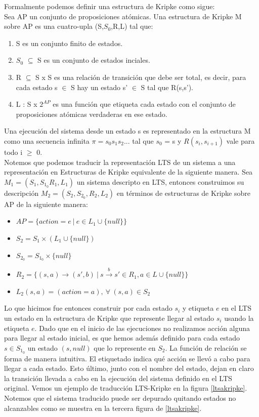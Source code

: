 \documentclass[titlepage, 12pt]{book}
\begin{document}
Formalmente podemos definir una estructura de Kripke como sigue\cite{Clarke}:\\

Sea AP un conjunto de proposiciones at\'omicas. Una estructura de Kripke M sobre AP es una cuatro-upla (S,$S_0$,R,L) tal que:
\begin{enumerate}
\item S es un conjunto finito de estados.
\item $S_0$ $\subseteq$ S es un conjunto de estados inciales.
\item R $\subseteq$ S x S es una relaci\'on de transici\'on que debe ser total, es decir, para cada estado s $\in$ S hay un estado s' $\in$ S tal que R(s,s').
\item L : S x $2^{AP}$ es una funci\'on que etiqueta cada estado con el conjunto de proposiciones atómicas verdaderas en ese estado.
\end{enumerate}
Una ejecuci\'on del sistema desde un estado s es representado en la estructura M como una secuencia infinita $\pi = s_0s_1s_2...$ tal que $s_0$ = s y $R(s_i,s_{i+1})$ vale para todo i $\geq$ 0.\\

Notemos que podemos traducir la representación LTS de un sistema a una representaci\'on en Estructuras de Kripke equivalente de la siguiente manera. Sea $M_1 = (S_1, S_{1_0} R_1, L_1)$ un sistema descripto en LTS, entonces construimos su descripci\'on $M_2 = (S_2,S_{2_0},R_2,L_2)$ en t\'erminos de estructuras de Kripke sobre AP de la siguiente manera:
\begin{itemize}
\item $ AP = \{action = e ~|~ e \in L_1 \cup \{null\}\} $
\item $ S_2 = S_1 \times (L_1 \cup \{null\}) $
\item $S_{2_0} = S_{1_0} \times \{null\}$
\item $R_2 = \{(s,a) \rightarrow (s',b) ~|~ s\overset{b}{\rightarrow}s' \in R_1, a \in L \cup \{null\}\}$
\item $L_2(s,a) = (action = a), ~\forall~(s,a) \in S_2$
\end{itemize}
Lo que hicimos fue entonces construir por cada estado $s_i$ y etiqueta $e$ en el LTS un estado en la estructura de Kripke que represente llegar al estado $s_i$ usando la etiqueta $e$. Dado que en el inicio de las ejecuciones no realizamos acci\'on alguna para llegar al estado inicial, es que hemos adem\'as definido para cada estado $s \in S_{1_0}$ un estado $(s,null)$ que lo represente en $S_2$. La funci\'on de relaci\'on se forma de manera intuitiva. El etiquetado indica qu\'e acci\'on se llev\'o a cabo para llegar a cada estado. Esto \'ultimo, junto con el nombre del estado, dejan en claro la transici\'on llevada a cabo en la ejecuci\'on del sistema definido en el LTS original. Vemos un ejemplo de traducci\'on LTS-Kripke en la figura \ref{ltsakripke}. Notemos que el sistema traducido puede ser depurado quitando estados no alcanzables como se muestra en la tercera figura de \ref{ltsakripke}.
\end{document}
